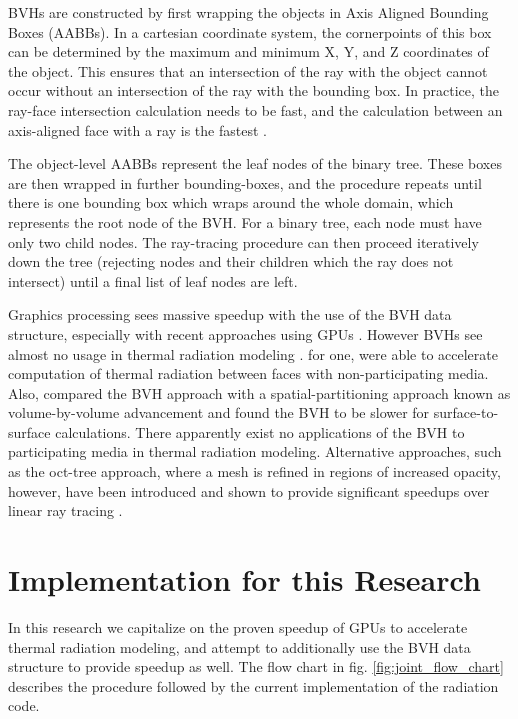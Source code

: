 BVHs are constructed by first wrapping the objects in Axis Aligned Bounding Boxes (AABBs). In a cartesian coordinate system, the cornerpoints of this box can be determined by the maximum and minimum X, Y, and Z coordinates of the object.
This ensures that an intersection of the ray with the object cannot occur without an intersection of the ray with the bounding box. 
In practice, the ray-face intersection calculation needs to be fast, and the calculation between an axis-aligned face with a ray is the fastest \cite{Kay1986RayScenes}.

The object-level AABBs represent the leaf nodes of the binary tree. These boxes are then wrapped in further bounding-boxes, and the procedure repeats until there is one bounding box which wraps around the whole domain, which represents the root node of the BVH. 
For a binary tree, each node must have only two child nodes. The ray-tracing procedure can then proceed iteratively down the tree (rejecting nodes and their children which the ray does not intersect) until a final list of leaf nodes are left.

Graphics processing sees massive speedup with the use of the BVH data structure, especially with recent approaches using GPUs \cite{Nery2013ParallelGPGPUs,Meister2021ATracing,Karras2012MaximizingTrees}.
However BVHs see almost no usage in thermal radiation modeling \cite{Liu2020TheFlames}.
\citet{Kuczynskia2014RadiationBoundaries} for one, were able to accelerate computation of thermal radiation between faces with non-participating media. 
Also, \citet{Mazumder2006MethodsTransport} compared the BVH approach with a spatial-partitioning approach known as volume-by-volume advancement and found the BVH to be slower for surface-to-surface calculations. 
There apparently exist no applications of the BVH to participating media in thermal radiation modeling. Alternative approaches, such as the oct-tree approach, where a mesh is refined in regions of increased opacity, however, have been introduced and shown to provide significant speedups over linear ray tracing \cite{Saftly2013UsingNote}.

\section{Implementation for this Research} \label{section:ModelForThisStudy}
In this research we capitalize on the proven speedup of GPUs to accelerate thermal radiation modeling, and attempt to additionally use the BVH data structure to provide speedup as well.
The flow chart in fig. \ref{fig:joint_flow_chart} describes the procedure followed by the current implementation of the radiation code.

